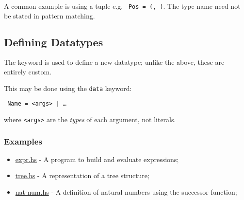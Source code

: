 A common example is using a tuple e.g. \texttt{ Pos = (, )}. The type name need not be stated in pattern matching.

\subsection{Defining Datatypes}
The  keyword is used to define a new datatype; unlike the above, these are entirely custom.

This may be done using the \texttt{data} keyword:
\begin{center}
  \texttt{ Name =  <args> | \ldots}
\end{center}
where \texttt{<args>} are the \textit{types} of each argument, not literals.

\subsubsection{Examples}
\begin{itemize}
  \item \url{expr.hs} - A program to build and evaluate expressions;
  \item \url{tree.hs} - A representation of a tree structure;
  \item \url{nat-num.hs} - A definition of natural numbers using the successor function;
\end{itemize}